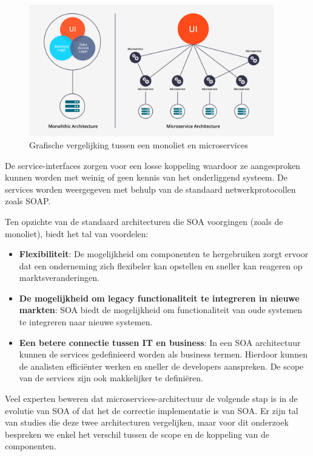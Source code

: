 \begin{figure}[!htb]
    \includegraphics[width=0.95\textwidth]{Microservices_vs_mono.png}
    \caption{Grafische vergelijking tussen een monoliet en microservices \label{microvsmono}}
    \centering

\end{figure}

De service-interfaces zorgen voor een losse koppeling waardoor ze aangesproken kunnen worden met weinig of geen kennis van het onderliggend systeem. De services worden weergegeven met behulp van de standaard netwerkprotocollen zoals SOAP.

Ten opzichte van de standaard architecturen die SOA voorgingen (zoals de monoliet), biedt het tal van voordelen:
\begin{itemize}
     \item \textbf{Flexibiliteit}: De mogelijkheid om componenten te hergebruiken zorgt ervoor dat een onderneming zich flexibeler kan opstellen en sneller kan reageren op marktsveranderingen. 
     \item \textbf{De mogelijkheid om legacy functionaliteit te integreren in nieuwe markten}: SOA biedt de mogelijkheid om functionaliteit van oude systemen te integreren naar nieuwe systemen.
     \item \textbf{Een betere connectie tussen IT en business}: In een SOA architectuur kunnen de services gedefinieerd worden als business termen. Hierdoor kunnen de analisten efficiënter werken en sneller de developers aanspreken. De scope van de services zijn ook makkelijker te definiëren.
\end{itemize} 

Veel experten beweren dat microservices-architectuur de volgende stap is in de evolutie van SOA of dat het de correctie implementatie is van SOA. Er zijn tal van studies die deze twee architecturen vergelijken, maar voor dit onderzoek bespreken we enkel het verschil tussen de scope en de koppeling van de componenten. \autocite{Education2019}


